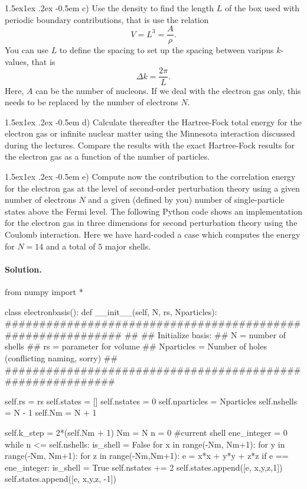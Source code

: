 \documentclass[%
oneside,                 %
final,                   %
10pt]{article}
\makeatletter
\newenvironment{doconceexercise}{}{}
\newcommand\subex{\@startsection{paragraph}{4}{\z@}%
                  {1.5ex\@plus1ex \@minus.2ex}%
                  {-0.5em}%
                  {\normalfont\normalsize\bfseries}}
\makeatother
\begin{document}
\begin{doconceexercise}
\subex{c)}
Use the density to find the length $L$ of the box used with periodic boundary contributions, that is use the relation
\[
  V= L^3= \frac{A}{\rho}.
\]
You can use $L$ to define the spacing to set up the spacing between varipus $k$-values, that is
\[
  \Delta k = \frac{2\pi}{L}.
\]
Here, $A$ can be the number of nucleons. If we deal with the electron gas only,  this needs to be replaced by  the number of electrons $N$.

\subex{d)}
Calculate thereafter the Hartree-Fock total energy for the electron gas or infinite nuclear matter using the Minnesota interaction discussed during the lectures. Compare the results with the exact Hartree-Fock results  for the electron gas as a function of the number of particles.

\subex{e)}
Compute now the contribution to the correlation energy for the electron gas at the level of second-order perturbation theory using a given number of electrons $N$ and a given (defined by you) number of single-particle states above the Fermi level.
The following Python code shows an implementation for the electron gas in three dimensions for second perturbation theory using the Coulomb interaction. Here we have hard-coded a case which computes the energy for $N=14$ and a total of $5$ major shells.


\paragraph{Solution.}
\bpycod
from numpy import *

class electronbasis():
    def __init__(self, N, rs, Nparticles):
        ############################################################
        ##
        ##  Initialize basis: 
        ##  N = number of shells
        ##  rs = parameter for volume 
        ##  Nparticles = Number of holes (conflicting naming, sorry)
        ##
        ###########################################################
        
        self.rs = rs
        self.states = []
        self.nstates = 0
        self.nparticles = Nparticles
        self.nshells = N - 1
        self.Nm = N + 1
        
        self.k_step = 2*(self.Nm + 1)
        Nm = N
        n = 0 #current shell
        ene_integer = 0
        while n <= self.nshells:
            is_shell = False
            for x in range(-Nm, Nm+1):
                for y in range(-Nm, Nm+1):
                    for z in range(-Nm,Nm+1):
                        e = x*x + y*y + z*z
                        if e   == ene_integer:
                            is_shell = True
                            self.nstates += 2
                            self.states.append([e, x,y,z,1])
                            self.states.append([e, x,y,z, -1])
                            

\end{doconceexercise}
\end{document}
